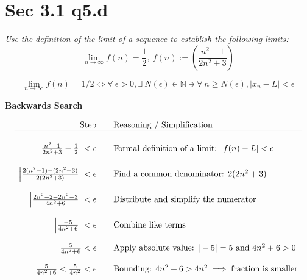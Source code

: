 \documentclass[11pt]{article}
\newcommand{\question}[1]{
    \begin{mdframed}[
        linecolor=gray,       %
        linewidth=0.5pt,      %
        innertopmargin=10pt,  %
        innerbottommargin=10pt %
    ]
    \centering \itshape #1
    \end{mdframed}
}
\theoremstyle{plain}
\begin{document}
\begin{minipage}{\textwidth}
	\section*{ Sec 3.1 q5.d}
	\question{
		Use the definition of the limit of a sequence to establish the following limits:
		\[ \lim_{n \to \infty} f(n) = \frac{1}{2}, ~f(n):=(\frac{n^2-1}{2n^2+3}) \]
	}
	\vspace{1em}
	\[ \lim_{n \to \infty} f(n)=1/2 \iff \forall ~\epsilon>0, \exists ~N(\epsilon) \in \mathbb{N} \ni \forall ~n \geq  N(\epsilon), |x_n - L| < \epsilon \]

	\begin{center} \textbf{Backwards Search} \end{center}
	\vspace{1em}
	\[
		\begin{array}{rll}
			\text{Step}                                                     &  & \text{Reasoning / Simplification}                                              \\
			\hline                                                                                                                                              \\
			\left| \frac{n^2-1}{2n^2+3} - \frac{1}{2} \right| < \epsilon    &  & \text{Formal definition of a limit: } |f(n) - L| < \epsilon                    \\ \\
			\left| \frac{2(n^2-1) - (2n^2+3)}{2(2n^2+3)} \right| < \epsilon &  & \text{Find a common denominator: } 2(2n^2+3)                                   \\ \\
			\left| \frac{2n^2-2 - 2n^2-3}{4n^2+6} \right| < \epsilon        &  & \text{Distribute and simplify the numerator}                                   \\ \\
			\left| \frac{-5}{4n^2+6} \right| < \epsilon                     &  & \text{Combine like terms}                                                      \\ \\
			\frac{5}{4n^2+6} < \epsilon                                     &  & \text{Apply absolute value: } |-5| = 5 \text{ and } 4n^2+6 > 0                 \\ \\
			\frac{5}{4n^2+6} < \frac{5}{4n^2} < \epsilon                    &  & \text{Bounding: } 4n^2+6 > 4n^2 \implies \text{fraction is smaller}            \\ \\

\end{array}\]
\end{minipage}
\end{document}
